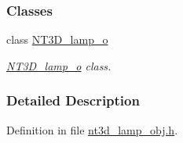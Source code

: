 \subsubsection*{Classes}
\begin{DoxyCompactItemize}
\item 
class \hyperlink{class_n_t3_d__lamp__o}{NT3D\_\-lamp\_\-o}
\begin{DoxyCompactList}\small\item\em \hyperlink{class_n_t3_d__lamp__o}{NT3D\_\-lamp\_\-o} class. \item\end{DoxyCompactList}\end{DoxyCompactItemize}


\subsubsection{Detailed Description}


Definition in file \hyperlink{nt3d__lamp__obj_8h_source}{nt3d\_\-lamp\_\-obj.h}.

